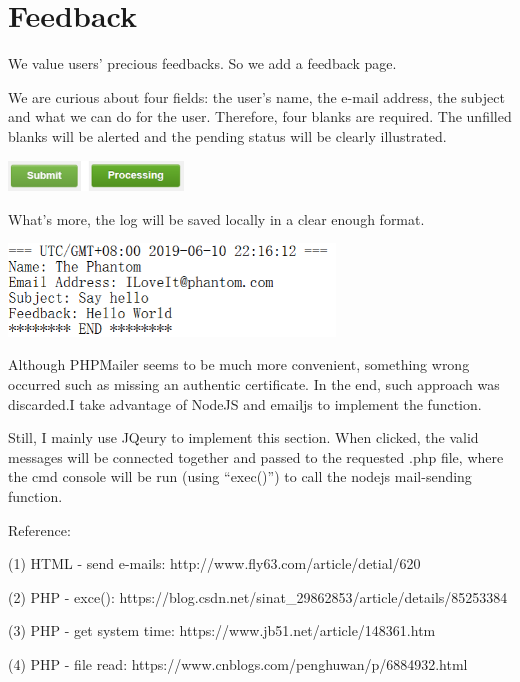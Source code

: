 \documentclass[10pt,twoside,a4paper,titlepage]{article}
\begin{document}
	\newpage

	\section{Feedback}
		We value users’ precious feedbacks. So we add a feedback page.\par
		We are curious about four fields: the user's name, the e-mail address, the subject and what we can do for the user. Therefore, four blanks are required. The unfilled blanks will be alerted and the pending status will be clearly illustrated.\par
		\indent\indent\includegraphics[width=0.35\textwidth]{gzl/08.png}\newline\par
		What’s more, the log will be saved locally in a clear enough format.\par
		\indent\indent\includegraphics[width=0.65\textwidth]{gzl/09.png}\newline\par
		Although PHPMailer seems to be much more convenient, something wrong occurred such as missing an authentic certificate. In the end, such approach was discarded.I take advantage of NodeJS and emailjs to implement the function.\par
		Still, I mainly use JQeury to implement this section. When clicked, the valid messages will be connected together and passed to the requested .php file, where the cmd console will be run (using “exec()”) to call the nodejs mail-sending function.\newline\par
		Reference:\par
		\indent\indent(1) HTML - send e-mails: http://www.fly63.com/article/detial/620\par
		\indent\indent(2) PHP - exce(): https://blog.csdn.net/sinat\_29862853/article/details/85253384\par
		\indent\indent(3) PHP - get system time: https://www.jb51.net/article/148361.htm\par
		\indent\indent(4) PHP - file read: https://www.cnblogs.com/penghuwan/p/6884932.html\par
\end{document}
